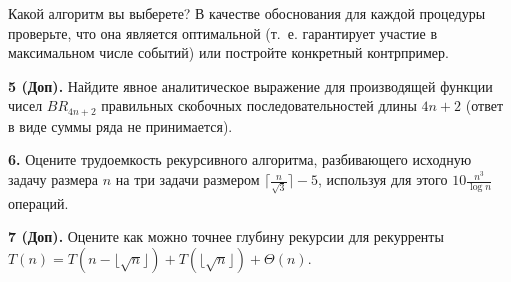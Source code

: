 \documentclass[11pt,a5paper,fleqn]{article}
\begin{document}
      Какой алгоритм вы выберете? В качестве обоснования для каждой процедуры проверьте, что она является оптимальной (т.~е. гарантирует участие в максимальном числе событий) или постройте конкретный контрпример. 
 

\smallskip


{\bf 5 (Доп).} Найдите явное аналитическое выражение для производящей функции чисел $BR_{4n+2}$ правильных скобочных последовательностей длины $4n+2$ (ответ в виде суммы ряда не принимается). 

\smallskip

{\bf 6.} Оцените трудоемкость рекурсивного алгоритма, разбивающего исходную задачу размера $n$ на три задачи размером $\lceil\frac{n}{\sqrt{3}}\rceil-5$, используя для этого $10\frac{n^3}{\log n}$ операций.

\smallskip

{\bf 7 (Доп).}  Оцените как можно точнее глубину рекурсии для рекурренты
$T(n) = T(n-\lfloor \sqrt{n} \rfloor) + T(\lfloor \sqrt{n} \rfloor) + \Theta(n)$.
\end{document}
